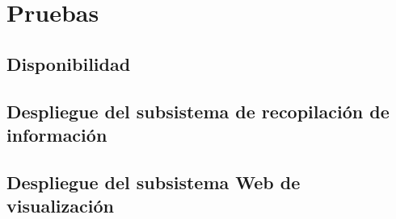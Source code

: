 \section{Pruebas}

\subsection{Disponibilidad}
 
\subsection{Despliegue del subsistema de recopilación de información}

\subsection{Despliegue del subsistema Web de visualización}

\newpage





